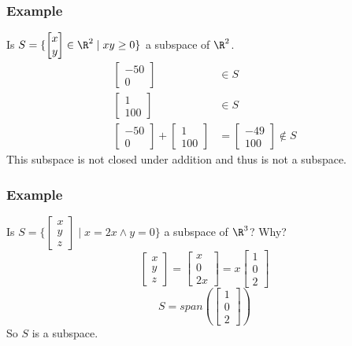 \documentclass{math}
\begin{document}
\subsubsection*{Example}
Is \( S = \{\begin{bmatrix}x \\ y\end{bmatrix}\in\R^2\mid xy\ge0\} \) a subspace
of \( \R^2 \).
\begin{align*}
  \begin{bmatrix}-50 \\ 0\end{bmatrix} &\in S \\
  \begin{bmatrix}1 \\ 100\end{bmatrix} &\in S \\
  \begin{bmatrix}-50 \\ 0\end{bmatrix}+\begin{bmatrix}1 \\ 100\end{bmatrix}
    &= \begin{bmatrix}-49 \\ 100\end{bmatrix} \notin S
\end{align*}
This subspace is not closed under addition and thus is not a subspace.

\subsubsection*{Example}
Is \( S = \{\begin{bmatrix}x \\ y \\ z\end{bmatrix}\mid x = 2x \wedge y = 0 \}
\) a subspace of \( \R^3 \)? Why?
\[ \begin{bmatrix}x \\ y \\ z\end{bmatrix} =
  \begin{bmatrix}x \\ 0 \\ 2x\end{bmatrix} =
  x\begin{bmatrix}1 \\ 0 \\ 2\end{bmatrix} \]
\[ S = span(\begin{bmatrix}1 \\ 0 \\ 2\end{bmatrix}) \]
So \( S \) is a subspace.
\end{document}
